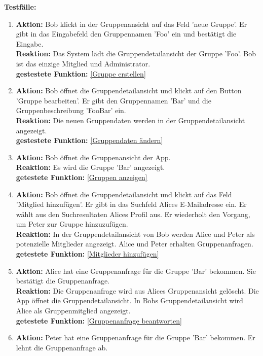 \documentclass[parskip=full]{scrartcl}
\def\threedigits#1{%
  \ifnum#1<100 0\fi
  \ifnum#1<10 0\fi
  \number#1}
\begin{document}
\textbf{Testfälle:}
\begin{enumerate}[label={\textbf{/T\protect\threedigits{\theenumi}0/}}, leftmargin=*, resume]
	\item \textbf{Aktion:} Bob klickt in der Gruppenansicht auf das Feld 'neue Gruppe'. Er gibt in das Eingabefeld den Gruppennamen 'Foo' ein und bestätigt die Eingabe.\\
	\textbf{Reaktion:} Das System lädt die Gruppendetailansicht der Gruppe 'Foo'. Bob ist das einzige Mitglied und Administrator.\\
	\textbf{gestestete Funktion:} \ref{Gruppe erstellen}
	\item \textbf{Aktion:} Bob öffnet die Gruppendetailansicht und klickt auf den Button 'Gruppe bearbeiten'. Er gibt den Gruppennamen 'Bar' und die Gruppenbeschreibung 'FooBar' ein.\\
	\textbf{Reaktion:} Die neuen Gruppendaten werden in der Gruppendetailansicht angezeigt.\\
	\textbf{gestestete Funktion:} \ref{Gruppendaten ändern}
	\item \textbf{Aktion:} Bob öffnet die Gruppenansicht der App.\\
	\textbf{Reaktion:} Es wird die Gruppe 'Bar' angezeigt.\\
	\textbf{getestete Funktion: }\ref{Gruppen anzeigen}
	\item \textbf{Aktion:} Bob öffnet die Gruppendetailansicht und klickt auf das Feld 'Mitglied hinzufügen'. Er gibt in das Suchfeld Alices E-Mailadresse ein. Er wählt aus den Suchresultaten Alices Profil aus. Er wiederholt den Vorgang, um Peter zur Gruppe hinzuzufügen.\\
	\textbf{Reaktion:} In der Gruppendetailansicht von Bob werden Alice und Peter als potenzielle Mitglieder angezeigt. Alice und Peter erhalten Gruppenanfragen.\\
	\textbf{getestete Funktion: }\ref{Mitglieder hinzufügen}
	\item \textbf{Aktion:} Alice hat eine Gruppenanfrage für die Gruppe 'Bar' bekommen. Sie bestätigt die Gruppenanfrage.\\
	\textbf{Reaktion:} Die Gruppenanfrage wird aus Alices Gruppenansicht gelöscht. Die App öffnet die Gruppendetailansicht. In Bobs Gruppendetailansicht wird Alice als Gruppenmitglied angezeigt.\\
	\textbf{getestete Funktion:} \ref{Gruppenanfrage beantworten}
	\item \textbf{Aktion:} Peter hat eine Gruppenanfrage für die Gruppe 'Bar' bekommen. Er lehnt die Gruppenanfrage ab.\\

\end{enumerate}
\end{document}
